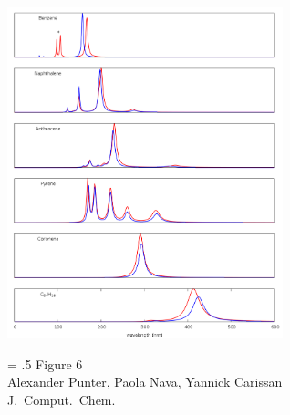 \documentclass[12pt]{article}
\begin{document}
\clearpage

\begin{figure}

\begin{center}
\includegraphics[width=8cm]{grand_rpa_singlet}
\end{center}
{\Large
\begin{minipage}[t]{3in}
\baselineskip = .5\baselineskip
Figure 6 \\
Alexander Punter, Paola Nava, Yannick Carissan\\
J.\ Comput.\ Chem.
\end{minipage}
}
\end{figure}

\clearpage
\end{document}
